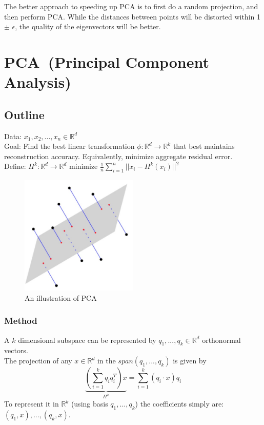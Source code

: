 The better approach to speeding up PCA is to first do a random
projection, and then perform PCA. While the distances between points
will be distorted within 1 $\pm$ $\epsilon$, the quality of the
eigenvectors will be better.  


\section{PCA~(Principal Component Analysis)}
\subsection{Outline}
Data: $x_1,x_2,...,x_n \in \mathbb{R}^d$\\

\noindent Goal: Find the best linear transformation $\phi:
\mathbb{R}^d \rightarrow \mathbb{R}^k$ that best maintains
reconstruction accuracy. Equivalently, minimize aggregate residual
error.\\ 

\noindent Define: $\Pi^k: \mathbb{R}^d \rightarrow \mathbb{R}^d$
minimize $\frac{1}{n} \sum_{i=1}^n ||x_i - \Pi^k (x_i)||^2$\\

\begin{figure}[h!]
\begin{center}
\includegraphics[width=0.5\textwidth]{chapter_6/files/projections.jpg}
\caption{An illustration of PCA}
\end{center}
\end{figure}
\subsubsection{Method}

A $k$ dimensional subspace can be represented by $q_1,...,q_k \in
\mathbb{R}^d$ orthonormal vectors.\\ 
The projection of any $x\in \mathbb{R}^d$ in the $span(q_1,...,q_k)$
is given by 
\[
\underbrace{(\sum_{i=1}^k q_i q_i^T)x}_{\Pi^k} = \sum_{i=1}^k
(q_i\cdot x)q_i 
\]
To represent it in $\mathbb{R}^k$ (using basis $q_1,...,q_k$) the
coefficients simply are: $(q_1,x),...,(q_k,x)$.\\ 
